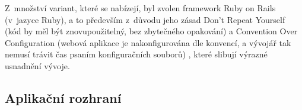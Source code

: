 \documentclass[twoside]{ctuthesis}
\begin{document}
Z~množství variant, které se nabízejí, byl zvolen framework Ruby on Rails (v~jazyce Ruby), a to především z~důvodu jeho zásad Don't Repeat Yourself (kód by měl být znovupoužitelný, bez zbytečného opakování) a Convention Over Configuration (webová aplikace je nakonfigurována dle konvencí, a vývojář tak nemusí trávit čas psaním konfiguračních souborů) \cite{rails2020}, které slibují výrazné usnadnění vývoje.


%
%
%
%
%



\subsection{Aplikační rozhraní}
\end{document}
